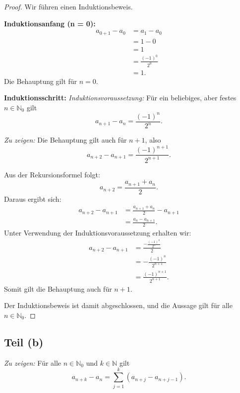 \documentclass{article}
\theoremstyle{definition}
\theoremstyle{remark}
\begin{document}
\begin{proof}
Wir führen einen Induktionsbeweis.

\textbf{Induktionsanfang (n = 0):}
\begin{align*}
a_{0+1} - a_0 &= a_1 - a_0 \\
&= 1 - 0 \\
&= 1 \\
&= \frac{(-1)^0}{2^0} \\
&= 1.
\end{align*}
Die Behauptung gilt für \( n = 0 \).

\textbf{Induktionsschritt:}
\textit{Induktionsvoraussetzung:} Für ein beliebiges, aber festes \( n \in \mathbb{N}_0 \) gilt
\[ a_{n+1} - a_n = \frac{(-1)^n}{2^n}. \]

\textit{Zu zeigen:} Die Behauptung gilt auch für \( n+1 \), also
\[ a_{n+2} - a_{n+1} = \frac{(-1)^{n+1}}{2^{n+1}}. \]

Aus der Rekursionsformel folgt:
\[ a_{n+2} = \frac{a_{n+1} + a_n}{2}. \]
Daraus ergibt sich:
\begin{align*}
a_{n+2} - a_{n+1} &= \frac{a_{n+1} + a_n}{2} - a_{n+1} \\
&= \frac{a_n - a_{n+1}}{2}.
\end{align*}
Unter Verwendung der Induktionsvoraussetzung erhalten wir:
\begin{align*}
a_{n+2} - a_{n+1} &= \frac{-\frac{(-1)^n}{2^n}}{2} \\
&= -\frac{(-1)^n}{2^{n+1}} \\
&= \frac{(-1)^{n+1}}{2^{n+1}}.
\end{align*}
Somit gilt die Behauptung auch für \( n+1 \).

Der Induktionsbeweis ist damit abgeschlossen, und die Aussage gilt für alle \( n \in \mathbb{N}_0 \).
\end{proof}

\subsection*{Teil (b)}
\textit{Zu zeigen:} Für alle \( n \in \mathbb{N}_0 \) und \( k \in \mathbb{N} \) gilt
\[ a_{n+k} - a_n = \sum_{j=1}^{k} (a_{n+j} - a_{n+j-1}). \]
\end{document}
